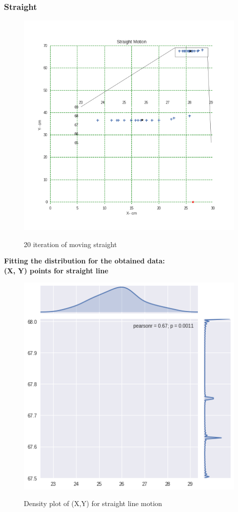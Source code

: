 \documentclass[11pt,a4paper]{article}
\begin{document}
\begin{itemize}
\subsubsection{Straight}
\begin{figure}[H]
\centering	
\includegraphics[width=1.2\linewidth]{Straight}
\label{fig:straight}
\caption{20 iteration of moving straight}
\end{figure}

\newpage
\textbf{Fitting the distribution for the obtained data: \\ (X, Y) points for straight line}
\begin{figure}[H]
\centering	
\includegraphics[width=0.8\linewidth]{straightG}
\label{fig:straightG}
\caption{Density plot of (X,Y) for straight line motion}
\end{figure}


\end{itemize}
\end{document}
